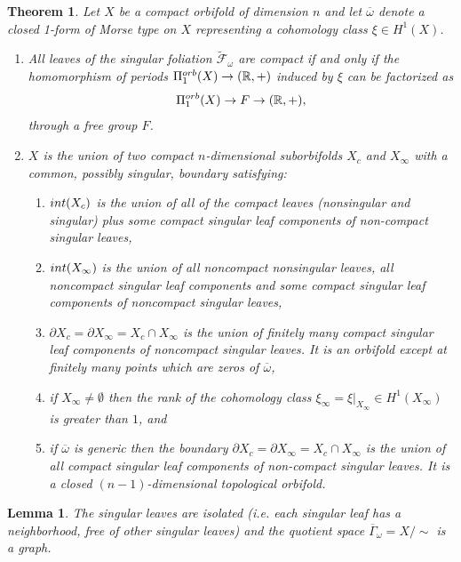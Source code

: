\documentclass[10pt,a4paper]{amsart}
\newtheorem{theorem}{Theorem}
\newtheorem{lemma}{Lemma}
\begin{document}
\begin{theorem}\label{thm1}
Let $X$ be a compact orbifold of dimension $n$ and let $\overline{\omega}$ denote a closed 1-form of Morse type on $X$ representing a cohomology class $\xi\in H^1(X)$.
\begin{enumerate}
\item All leaves of the singular foliation $\tilde{\mathcal{F}}_\omega$ are
compact if and only if the homomorphism of periods $\Pi_1^{\textnormal{orb}}(X)\to (\mathbb{R},+)$ induced by $\xi$ can be factorized 
as 
$$\Pi_1^{\textnormal{orb}}(X)\to F\to (\mathbb{R},+),$$
through a free group $F$. 
\item $X$ is the union of two compact $n$-dimensional suborbifolds $X_c$ and $X_\infty$ with a common, possibly singular, boundary satisfying:
\begin{enumerate}
	\item $\textnormal{int}(X_c)$ is the union of all of the compact leaves (nonsingular and singular) plus some compact singular leaf components of non-compact singular leaves,
	\item $\textnormal{int}(X_\infty)$ is the union of all noncompact nonsingular leaves, all noncompact singular leaf components and some compact singular leaf components of noncompact singular leaves,
	\item $\partial  X_c=\partial X_\infty=X_c\cap X_\infty$ is the union of finitely many compact singular leaf components of noncompact singular leaves. It is an orbifold except at finitely many points which are zeros of $\overline{\omega}$,
	\item if $X_\infty\neq \emptyset$ then the rank of the cohomology class $\xi_\infty=\xi|_{X_\infty}\in H^1(X_\infty)$ is greater than $1$, and
	\item if $\overline{\omega}$ is generic then the boundary $\partial  X_c=\partial X_\infty=X_c\cap X_\infty$ is the union of all compact singular leaf components of non-compact singular leaves. It is a closed $(n-1)$-dimensional topological orbifold.
\end{enumerate}
\end{enumerate}
\end{theorem}

\begin{lemma}\label{w-graph}
The singular leaves are isolated (i.e. each singular leaf has
a neighborhood, free of other singular leaves) and the quotient space $\overline{\Gamma}_\omega=X/\sim$ is a graph.
\end{lemma}
\end{document}
